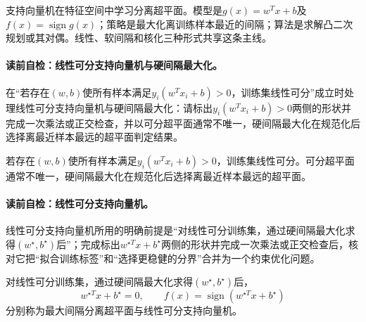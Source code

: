 \label{struct:V3-C02-CH06}
支持向量机在特征空间中学习分离超平面。模型是$g(x)=w^Tx+b$及$f(x)=\operatorname{sign}g(x)$；策略是最大化离训练样本最近的间隔；算法是求解凸二次规划或其对偶。线性、软间隔和核化三种形式共享这条主线。

\paragraph{读前自检：线性可分支持向量机与硬间隔最大化。}在“若存在$(w,b)$使所有样本满足$y_i(w^Tx_i+b)>0$，训练集线性可分”成立时处理线性可分支持向量机与硬间隔最大化：请标出$y_i(w^Tx_i+b)>0$两侧的形状并完成一次乘法或正交检查，并以可分超平面通常不唯一，硬间隔最大化在规范化后选择离最近样本最远的超平面判定结果。\par

若存在$(w,b)$使所有样本满足$y_i(w^Tx_i+b)>0$，训练集线性可分。可分超平面通常不唯一，硬间隔最大化在规范化后选择离最近样本最远的超平面。

\paragraph{读前自检：线性可分支持向量机。}线性可分支持向量机所用的明确前提是“对线性可分训练集，通过硬间隔最大化求得$(w^\star,b^\star)$后”；完成标出$w^{\star T}x+b^\star$两侧的形状并完成一次乘法或正交检查后，核对它把“拟合训练标签”和“选择更稳健的分界”合并为一个约束优化问题。\par

\label{struct:V3-C02-CH07}

\begin{definition}[线性可分支持向量机]\label{def:V3-C02-hard-svm}
对线性可分训练集，通过硬间隔最大化求得$(w^\star,b^\star)$后，
\[
w^{\star T}x+b^\star=0,\qquad
f(x)=\operatorname{sign}(w^{\star T}x+b^\star)
\]
分别称为最大间隔分离超平面与线性可分支持向量机。
\end{definition}

